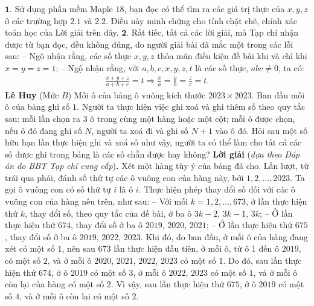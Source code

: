 \begin{multicols}{2}
	\vskip 0.05cm
	$\pmb{1.}$ Sử dụng phần mềm Maple $18$, bạn đọc có thể tìm ra các giá trị thực của $x, y, z$ ở các trường hợp $2.1$ và $2.2$. Điều này minh chứng cho tính chặt chẽ, chính xác toán học của Lời giải trên đây.
	\vskip 0.05cm
	$\pmb{2.}$ Rất tiếc, tất cả các lời giải, mà Tạp chí nhận được từ bạn đọc, đều không đúng, do người giải bài đã mắc một trong các lỗi sau:
	\vskip 0.05cm
	-- Ngộ nhận rằng, các số thực $x, y, z$ thỏa mãn điều kiện đề bài khi và chỉ khi $x = y = z = 1$;
	\vskip 0.05cm
	-- Ngộ nhận rằng, với $a, b, c, x, y, z, t$ là các số thực, $abc \ne 0$, ta có:
	\begin{align*}
		\frac{{x + y + z}}{{a + b + c}} = t \Rightarrow \frac{x}{a} = \frac{y}{b} = \frac{z}{c} = t.
	\end{align*}
	\hfill\textbf{\color{thachthuctoanhoc}Lê Huy}
	\vskip 0.05cm
	{}
	(Mức $B$) Mỗi ô của bảng ô vuông kích thước $2023\times2023$. Ban đầu mỗi ô của bảng ghi số $1$. Người ta thực hiện việc ghi xoá và ghi thêm số theo quy tắc sau: mỗi lần chọn ra $3$ ô trong cùng một hàng hoặc một cột; mỗi ô được chọn, nếu ô đó đang ghi số $N$, người ta xoá đi và ghi số $N+1$ vào ô đó. 
	\vskip 0.05cm
	Hỏi sau một số hữu hạn lần thực hiện ghi và xoá số như vậy, người ta có thể làm cho tất cả các số được ghi trong bảng là các số chẵn được hay không?
	\vskip 0.1cm
	\textbf{\color{thachthuctoanhoc}Lời giải} (\textit{dựa theo Đáp án do BBT Tạp chí cung cấp})\textbf{\color{thachthuctoanhoc}.}
	\vskip 0.05cm
	Xét một hàng tùy ý của bảng đã cho. Lần lượt, từ trái qua phải, đánh số thứ tự các ô vuông con của hàng này, bởi $1, 2, \ldots, 2023$. Ta gọi ô vuông con có số thứ tự $i$ là ô $i$.
	\vskip 0.05cm
	Thực hiện phép thay đổi số đối với các ô vuông con của hàng nêu trên, như sau:
	\vskip 0.05cm
	-- Với mỗi $k = 1, 2, \ldots, 673$, ở lần thực hiện thứ $k$, thay đổi số, theo quy tắc của đề bài, ở ba ô $3k - 2$, $3k - 1$, $3k$;
	\vskip 0.05cm
	-- Ở lần thực hiện thứ $674$, thay đổi số ở ba ô $2019$, $2020$, $2021$;
	\vskip 0.05cm
	-- Ở lần thực hiện thứ $675$, thay đổi số ở ba ô $2019$, $2022$, $2023$.
	\vskip 0.05cm
	Khi đó, do ban đầu, ở mỗi ô của hàng đang xét có một số $1$, nên sau $673$ lần thực hiện đầu tiên, ở mỗi ô, từ ô $1$ đến ô $2019$, có một số $2$, và ở mỗi ô $2020$, $2021$, $2022$, $2023$ có một số $1$. Do đó, sau lần thực hiện thứ $674$, ở ô $2019$ có một số $3$, ở mỗi ô $2022$, $2023$ có một số $1$, và ở mỗi ô còn lại của hàng có một số $2$. Vì vậy, sau lần thực hiện thứ $675$, ở ô $2019$ có một số $4$, và ở mỗi ô còn lại có một số $2$.

\end{multicols}
